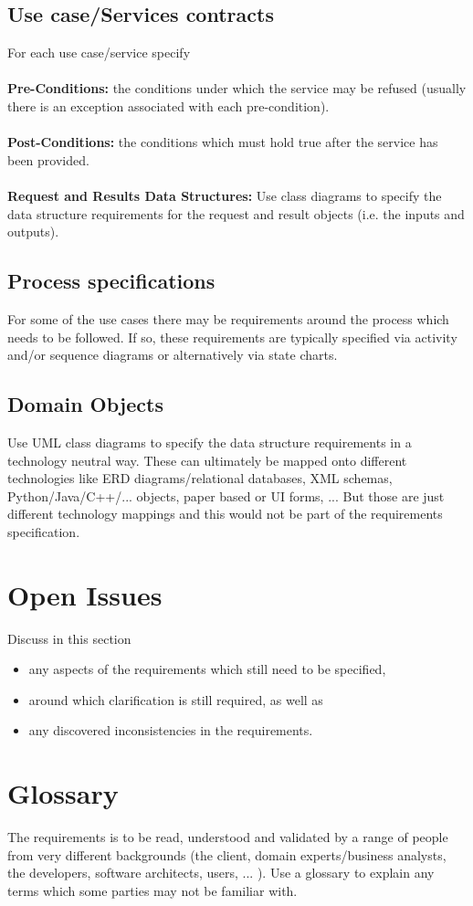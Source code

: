 \documentclass[11pt,a4paper]{article}
\begin{document}
\subsection{Use case/Services contracts}
For each use case/service specify
\\\\
\textbf{Pre-Conditions: }the conditions under which the service may be refused (usually there is an exception associated with each pre-condition).
\\\\
\textbf{Post-Conditions: }the conditions which must hold true after the service has been provided.
\\\\
\textbf{Request and Results Data Structures: }Use class diagrams to specify the data structure requirements for the request and result objects (i.e. the inputs and outputs).
\subsection{Process specifications}
For some of the use cases there may be requirements around the process which needs to be followed. If so, these requirements are typically specified via activity and/or sequence diagrams or
alternatively via state charts.
\subsection{Domain Objects}
Use UML class diagrams to specify the data structure requirements in a technology neutral way. These can ultimately be mapped onto different technologies like ERD diagrams/relational databases, XML schemas, Python/Java/C++/... objects, paper based or UI forms, ... But those are just different technology mappings and this would not be part of the requirements specification.
\section{Open Issues}
Discuss in this section
\begin{itemize}
\item any aspects of the requirements which still need to be specified,
\item around which clarification is still required, as well as
\item any discovered inconsistencies in the requirements.
\end{itemize}
\section{Glossary}
The requirements is to be read, understood and validated by a range of people from very different backgrounds (the client, domain experts/business analysts, the developers, software architects, users, ... ). Use a glossary to explain any terms which some parties may not be familiar with.
\end{document}
